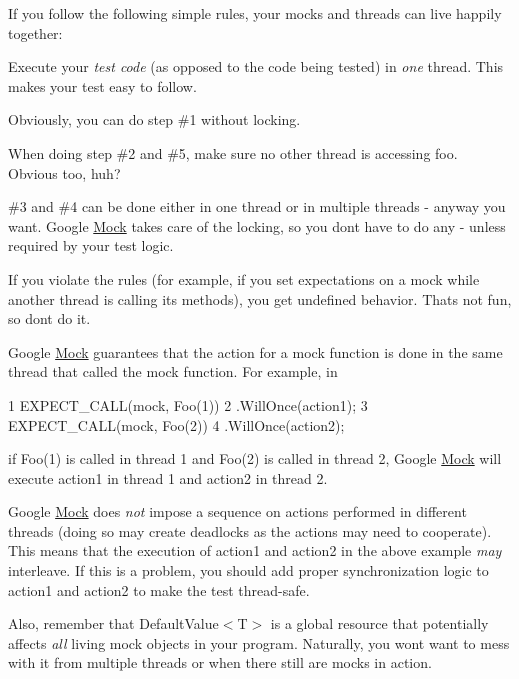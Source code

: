 If you follow the following simple rules, your mocks and threads can live happily together\+:


\begin{DoxyItemize}
\item Execute your {\itshape test code} (as opposed to the code being tested) in {\itshape one} thread. This makes your test easy to follow.
\item Obviously, you can do step \#1 without locking.
\item When doing step \#2 and \#5, make sure no other thread is accessing {\ttfamily foo}. Obvious too, huh?
\item \#3 and \#4 can be done either in one thread or in multiple threads -\/ anyway you want. Google \hyperlink{class_mock}{Mock} takes care of the locking, so you don\textquotesingle{}t have to do any -\/ unless required by your test logic.
\end{DoxyItemize}

If you violate the rules (for example, if you set expectations on a mock while another thread is calling its methods), you get undefined behavior. That\textquotesingle{}s not fun, so don\textquotesingle{}t do it.

Google \hyperlink{class_mock}{Mock} guarantees that the action for a mock function is done in the same thread that called the mock function. For example, in


\begin{DoxyCode}
1 EXPECT\_CALL(mock, Foo(1))
2     .WillOnce(action1);
3 EXPECT\_CALL(mock, Foo(2))
4     .WillOnce(action2);
\end{DoxyCode}


if {\ttfamily Foo(1)} is called in thread 1 and {\ttfamily Foo(2)} is called in thread 2, Google \hyperlink{class_mock}{Mock} will execute {\ttfamily action1} in thread 1 and {\ttfamily action2} in thread 2.

Google \hyperlink{class_mock}{Mock} does {\itshape not} impose a sequence on actions performed in different threads (doing so may create deadlocks as the actions may need to cooperate). This means that the execution of {\ttfamily action1} and {\ttfamily action2} in the above example {\itshape may} interleave. If this is a problem, you should add proper synchronization logic to {\ttfamily action1} and {\ttfamily action2} to make the test thread-\/safe.

Also, remember that {\ttfamily Default\+Value$<$T$>$} is a global resource that potentially affects {\itshape all} living mock objects in your program. Naturally, you won\textquotesingle{}t want to mess with it from multiple threads or when there still are mocks in action.

